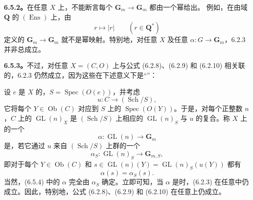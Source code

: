 \textbf{6.5.2。}在任意 $X$ 上，不能断言每个 $\mathbf G_m\to\mathbf G_m$ 都由一个幂给出。
例如，在由域 $\mathbf Q$ 的 $(\operatorname{Ens})$ 上，由
\[
 r\longmapsto |r|\qquad(r\in\mathbf Q^*)
\]
定义的 $\mathbf G_m\to\mathbf G_m$ 就不是幂映射。特别地，对任意 $X$ 及任意 $\alpha:G\to\mathbf G_m$，6.2.3 并非总成立。

\textbf{6.5.3。}不过，对任意 $X=(C,O)$ 上与公式 (6.2.8)、(6.2.9) 和 (6.2.10) 相关联的，6.2.3 仍然成立，因为这些在下述意义下是“”：

设 $e$ 是 $X$ 的，$S=\operatorname{Spec}(O(e))$，并考虑
\[
 u:C\longrightarrow(\operatorname{Sch}/S),
\]
它将每个 $Y\in\operatorname{Ob}(C)$ 对应到 $S$ 上的 $\operatorname{Spec}(O(Y))$。于是，对每个正整数 $n$，$C$ 上的 $\operatorname{GL}(n)_X$ 是 $(\operatorname{Sch}/S)$ 上相应的 $\operatorname{GL}(n)_S$ 与 $u$ 的复合。称 $X$ 上的一个
\[
 \alpha:\operatorname{GL}(n)\longrightarrow\mathbf G_m\tag{6.5.4}
\]
是，若它通过 $u$ 来自 $(\operatorname{Sch}/S)$ 上群的一个
\[
 \alpha_S:\operatorname{GL}(n)_S\longrightarrow\mathbf G_{m,S},\tag{6.5.5}
\]
即对于每个 $Y\in\operatorname{Ob}(C)$ 和 $s\in\operatorname{GL}(n)(Y)=\operatorname{GL}(n)_S(u(Y))$ 都有
\[
 \alpha(s)=\alpha_S(s).
\]
当然，(6.5.4) 中的 $\alpha$ 完全由 $\alpha_S$ 确定。立即可知，当 $\alpha$ 是时，(6.2.3) 在任意中仍成立。因此，特别地，公式 (6.2.8)、(6.2.9) 和 (6.2.10) 在任意上仍成立。
